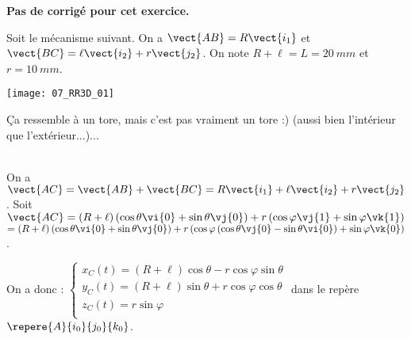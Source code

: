 \normalfalse \difficiletrue \tdifficilefalse
\correctiontrue


\setcounter{question}{0}
\ifcorrection
\else
\textbf{Pas de corrigé pour cet exercice.}
\fi

\ifprof
\else
Soit le mécanisme suivant. On a $\vect{AB}=R\vect{i_1}$ et $\vect{BC}=\ell\vect{i_2}+r\vect{j_2}$. On note $R+\ell=L = \SI{20}{mm}$ et $r=\SI{10}{mm}$.
\begin{center}
\texttt{[image: 07\_RR3D\_01]}
\end{center}
\fi


\ifprof
\else
{}
\fi

\ifprof
Ça ressemble à un tore, mais c'est pas vraiment un tore :) (aussi bien l'intérieur que l'extérieur...)...
\else
\fi

\ifprof ~\\
On a $\vect{AC}=\vect{AB}+\vect{BC} = R\vect{i_1} + \ell\vect{i_2}+r\vect{j_2}$. 
Soit $\vect{AC} = \left(R+\ell\right)\left(\cos\theta\vi{0} + \sin\theta\vj{0}\right)  + r\left(\cos\varphi \vj{1}+\sin\varphi \vk{1}\right)$  $= \left(R+\ell\right)\left(\cos\theta\vi{0} + \sin\theta\vj{0}\right)  + r\left(\cos\varphi \left(  \cos\theta\vj{0} - \sin\theta\vi{0}\right)+\sin\varphi \vk{0}\right)$.

On a donc :
$\left\{
\begin{array}{l}
x_C(t)= \left(R+\ell\right)\cos\theta  - r\cos\varphi  \sin\theta\\
y_C(t)= \left(R+\ell\right)\sin\theta  + r\cos\varphi \cos\theta \\
z_C(t)=  r\sin\varphi \\
\end{array}
\right.
$ dans le repère $\repere{A}{i_0}{j_0}{k_0}$.
\else
\fi


